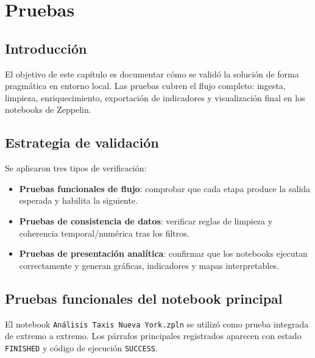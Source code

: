 \chapter{Pruebas}\label{cap:pruebas}

\section{Introducción}
El objetivo de este capítulo es documentar cómo se validó la solución de forma
pragmática en entorno local. Las pruebas cubren el flujo completo: ingesta,
limpieza, enriquecimiento, exportación de indicadores y visualización final en
los notebooks de Zeppelin.

\section{Estrategia de validación}
Se aplicaron tres tipos de verificación:

\begin{itemize}
	\item \textbf{Pruebas funcionales de flujo}: comprobar que cada etapa produce la
	salida esperada y habilita la siguiente.
	\item \textbf{Pruebas de consistencia de datos}: verificar reglas de limpieza y
	coherencia temporal/numérica tras los filtros.
	\item \textbf{Pruebas de presentación analítica}: confirmar que los notebooks
	ejecutan correctamente y generan gráficas, indicadores y mapas interpretables.
\end{itemize}

\section{Pruebas funcionales del notebook principal}
El notebook \texttt{Análisis Taxis Nueva York.zpln} se utilizó como prueba
integrada de extremo a extremo. Los párrafos principales registrados aparecen
con estado \texttt{FINISHED} y código de ejecución \texttt{SUCCESS}.


